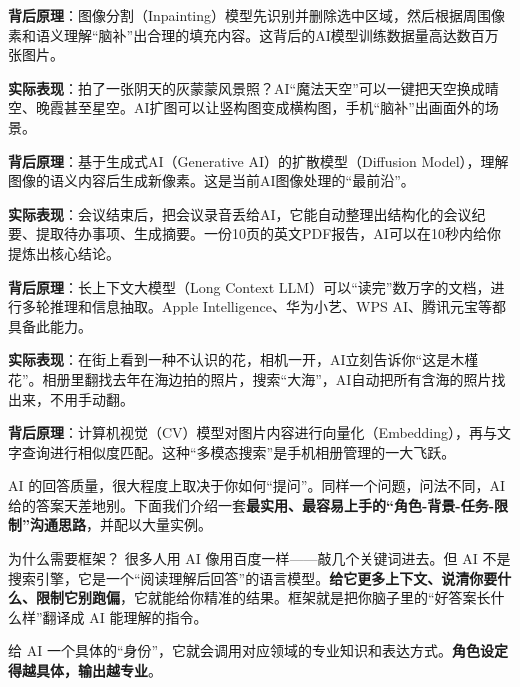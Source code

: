 \textbf{背后原理}：图像分割（Inpainting）模型先识别并删除选中区域，然后根据周围像素和语义理解“脑补”出合理的填充内容。这背后的AI模型训练数据量高达数百万张图片。


\textbf{实际表现}：拍了一张阴天的灰蒙蒙风景照？AI“魔法天空”可以一键把天空换成晴空、晚霞甚至星空。AI扩图可以让竖构图变成横构图，手机“脑补”出画面外的场景。

\textbf{背后原理}：基于生成式AI（Generative AI）的扩散模型（Diffusion Model），理解图像的语义内容后生成新像素。这是当前AI图像处理的“最前沿”。


\textbf{实际表现}：会议结束后，把会议录音丢给AI，它能自动整理出结构化的会议纪要、提取待办事项、生成摘要。一份10页的英文PDF报告，AI可以在10秒内给你提炼出核心结论。

\textbf{背后原理}：长上下文大模型（Long Context LLM）可以“读完”数万字的文档，进行多轮推理和信息抽取。Apple Intelligence、华为小艺、WPS AI、腾讯元宝等都具备此能力。


\textbf{实际表现}：在街上看到一种不认识的花，相机一开，AI立刻告诉你“这是木槿花”。相册里翻找去年在海边拍的照片，搜索“大海”，AI自动把所有含海的照片找出来，不用手动翻。

\textbf{背后原理}：计算机视觉（CV）模型对图片内容进行向量化（Embedding），再与文字查询进行相似度匹配。这种“多模态搜索”是手机相册管理的一大飞跃。


AI 的回答质量，很大程度上取决于你如何“提问”。同样一个问题，问法不同，AI 给的答案天差地别。下面我们介绍一套\textbf{最实用、最容易上手的“角色-背景-任务-限制”沟通思路}，并配以大量实例。

\begin{tcbinfo}{为什么需要框架？}
很多人用 AI 像用百度一样——敲几个关键词进去。但 AI 不是搜索引擎，它是一个“阅读理解后回答”的语言模型。\textbf{给它更多上下文、说清你要什么、限制它别跑偏}，它就能给你精准的结果。框架就是把你脑子里的“好答案长什么样”翻译成 AI 能理解的指令。

\end{tcbinfo}


给 AI 一个具体的“身份”，它就会调用对应领域的专业知识和表达方式。\textbf{角色设定得越具体，输出越专业}。

